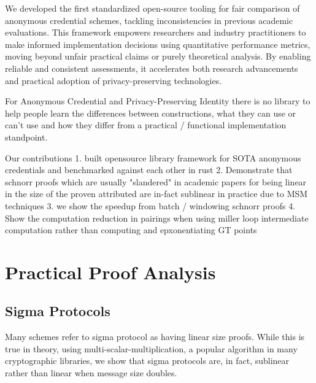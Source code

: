 We developed the first standardized open-source tooling for fair comparison of anonymous credential schemes, tackling inconsistencies in previous academic evaluations. This framework empowers researchers and industry practitioners to make informed implementation decisions using quantitative performance metrics, moving beyond unfair practical claims or purely theoretical analysis. By enabling reliable and consistent assessments, it accelerates both research advancements and practical adoption of privacy-preserving technologies.






























For Anonymous Credential and Privacy-Preserving Identity there is no library to help people learn the differences between constructions, what they can use or can't use and how they differ from a practical / functional implementation standpoint. 

Our contributions
1. built opensource library framework for SOTA anonymous credentials and benchmarked against each other in rust
2. Demonstrate that schnorr proofs which are usually "slandered" in academic papers for being linear in the size of the proven attributed are in-fact sublinear in practice due to MSM techniques
3. we show the speedup from batch / windowing schnorr proofs 
4. Show the computation reduction in pairings when using miller loop intermediate computation rather than computing and epxonentiating GT points



\section{Practical Proof Analysis}
\subsection{Sigma Protocols}\label{sigma-protocol-analysis}
Many schemes refer to sigma protocol as having linear size proofs. 
While this is true in theory, using multi-scalar-multiplication, a popular algorithm in many cryptographic libraries, we show that sigma protocols are, in fact, sublinear rather than linear when message size doubles.

